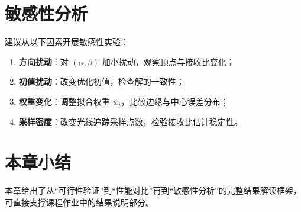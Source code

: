 \section{敏感性分析}
建议从以下因素开展敏感性实验：
\begin{enumerate}
  \item \textbf{方向扰动}：对 $(\alpha,\beta)$ 加小扰动，观察顶点与接收比变化；
  \item \textbf{初值扰动}：改变优化初值，检查解的一致性；
  \item \textbf{权重变化}：调整拟合权重 $w_i$，比较边缘与中心误差分布；
  \item \textbf{采样密度}：改变光线追踪采样点数，检验接收比估计稳定性。
\end{enumerate}

\section{本章小结}
本章给出了从“可行性验证”到“性能对比”再到“敏感性分析”的完整结果解读框架，可直接支撑课程作业中的结果说明部分。
